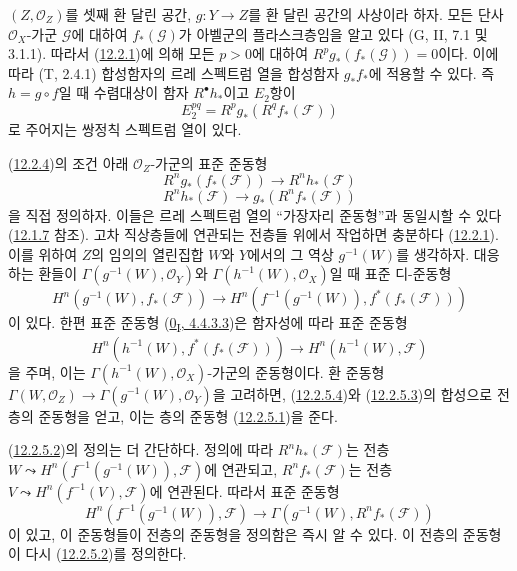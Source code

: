 \begin{env}[12.2.4]
\label{0.12.2.4-fr}
$(Z,\mathcal O_Z)$를 셋째 환 달린 공간, $g:Y\to Z$를 환 달린 공간의
사상이라 하자. 모든 단사 $\mathcal O_X$-가군 $\mathcal G$에 대하여
$f_*(\mathcal G)$가 아벨군의 플라스크층임을 알고 있다
(G, II, 7.1 및 3.1.1). 따라서
(\hyperref[0.12.2.1-fr]{12.2.1})에 의해 모든 $p>0$에 대하여
$R^p g_*(f_*(\mathcal G))=0$이다. 이에 따라 (T, 2.4.1) 합성함자의
르레 스펙트럼 열을 합성함자 $g_*f_*$에 적용할 수 있다. 즉
$h=g\circ f$일 때 수렴대상이 함자 $R^\bullet h_*$이고 $E_2$항이
\[
\label{0.12.2.4.1-fr}
\tag{12.2.4.1}
E_2^{pq}=R^p g_*(R^q f_*(\mathcal F))
\]
로 주어지는 쌍정칙 스펙트럼 열이 있다.
\end{env}

\begin{env}[12.2.5]
\label{0.12.2.5-fr}
(\hyperref[0.12.2.4-fr]{12.2.4})의 조건 아래 $\mathcal O_Z$-가군의
표준 준동형
\[
\label{0.12.2.5.1-fr}
\tag{12.2.5.1}
R^n g_*(f_*(\mathcal F))\longrightarrow R^n h_*(\mathcal F)
\]
\[
\label{0.12.2.5.2-fr}
\tag{12.2.5.2}
R^n h_*(\mathcal F)\longrightarrow g_*(R^n f_*(\mathcal F))
\]
을 직접 정의하자.
이들은 르레 스펙트럼 열의 ``가장자리 준동형''과 동일시할 수 있다
(\hyperref[0.12.1.7-fr]{12.1.7} 참조). 고차 직상층들에 연관되는
전층들 위에서 작업하면 충분하다
(\hyperref[0.12.2.1-fr]{12.2.1}). 이를 위하여 $Z$의 임의의 열린집합
$W$와 $Y$에서의 그 역상 $g^{-1}(W)$를 생각하자. 대응하는 환들이
$\Gamma(g^{-1}(W),\mathcal O_Y)$와
$\Gamma(h^{-1}(W),\mathcal O_X)$일 때 표준 디-준동형
\[
\label{0.12.2.5.3-fr}
\tag{12.2.5.3}
H^n(g^{-1}(W),f_*(\mathcal F))\longrightarrow
H^n(f^{-1}(g^{-1}(W)),f^*(f_*(\mathcal F)))
\]
이 있다. 한편 표준 준동형
(\hyperref[0.4.4.3.3-ko]{0\textsubscript{I}, 4.4.3.3})은 함자성에 따라
표준 준동형
\[
\label{0.12.2.5.4-fr}
\tag{12.2.5.4}
H^n(h^{-1}(W),f^*(f_*(\mathcal F)))\longrightarrow
H^n(h^{-1}(W),\mathcal F)
\]
을 주며, 이는 $\Gamma(h^{-1}(W),\mathcal O_X)$-가군의 준동형이다.
환 준동형
$\Gamma(W,\mathcal O_Z)\to\Gamma(g^{-1}(W),\mathcal O_Y)$을 고려하면,
(\hyperref[0.12.2.5.4-fr]{12.2.5.4})와
(\hyperref[0.12.2.5.3-fr]{12.2.5.3})의 합성으로 전층의 준동형을 얻고,
이는 층의 준동형 (\hyperref[0.12.2.5.1-fr]{12.2.5.1})을 준다.

(\hyperref[0.12.2.5.2-fr]{12.2.5.2})의 정의는 더 간단하다. 정의에
따라 $R^n h_*(\mathcal F)$는 전층
$W\leadsto H^n(f^{-1}(g^{-1}(W)),\mathcal F)$에 연관되고,
$R^n f_*(\mathcal F)$는 전층
$V\leadsto H^n(f^{-1}(V),\mathcal F)$에 연관된다. 따라서 표준 준동형
\[
H^n(f^{-1}(g^{-1}(W)),\mathcal F)\longrightarrow
\Gamma(g^{-1}(W),R^n f_*(\mathcal F))
\]
이 있고, 이 준동형들이 전층의 준동형을 정의함은 즉시 알 수 있다.
이 전층의 준동형이 다시
(\hyperref[0.12.2.5.2-fr]{12.2.5.2})를 정의한다.
\end{env}

